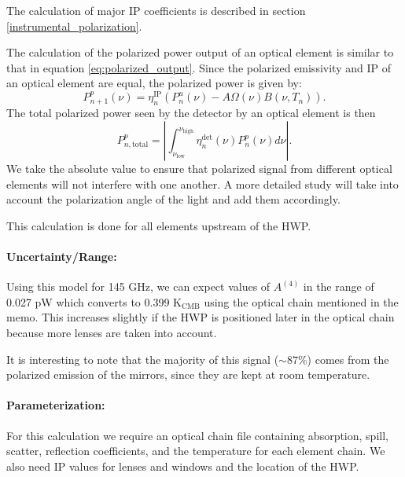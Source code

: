 The calculation of major IP coefficients is described in section \ref{instrumental_polarization}.


The calculation of the polarized power output of an optical element is similar to that in equation \ref{eq:polarized_output}.
Since the polarized emissivity and IP of an optical element are equal, the polarized power is given by:
\begin{equation}
P^p_{n+1}(\nu) = \eta^\text{IP}_n \left(P_n^u (\nu) - A\Omega(\nu) B(\nu, T_n) \right).
\end{equation}
The total polarized power seen by the detector by an optical element is then
\begin{equation}
P^p_{n, \text{total}} = \left|\int_{\nu_\text{low}}^{\nu_\text{high}} \eta_n^\text{det}(\nu) P^p_n(\nu) d\nu\right|.
\end{equation}
We take the absolute value to ensure that polarized signal from different optical elements will not interfere
with one another.
A more detailed study will take into account the polarization angle of the light and add them accordingly.

This calculation is done for all elements upstream of the HWP.

\paragraph{Uncertainty/Range:}
Using this model for 145 GHz, we can expect values of $A^{(4)}$ in the range of 0.027 pW which converts to 0.399 K$_\text{CMB}$ using the optical chain mentioned in the memo. This increases slightly if the HWP is positioned later in the optical chain 
because more lenses are taken into account.

It is interesting to note that the majority of this signal ($\sim 87\%$) comes from the polarized emission of the mirrors, 
since they are kept at room temperature.

\paragraph{Parameterization:}
For this calculation we require an optical chain file containing absorption, spill, scatter, reflection coefficients, and 
the temperature for each element chain. We also need IP values for lenses and windows and the location of the HWP. 


